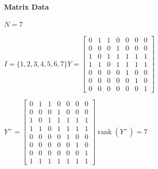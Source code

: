 \documentclass[11pt]{article}
\begin{document}
\noindent\textbf{Matrix Data}
\par $N=7$
\par $I=\{1,2,3,4,5,6,7\}$\quad$Y=\begin{bmatrix}0 & 1 & 1 & 0 & 0 & 0 & 0 \\ 0 & 0 & 0 & 1 & 0 & 0 & 0 \\ 1 & 0 & 1 & 1 & 1 & 1 & 1 \\ 1 & 1 & 0 & 1 & 1 & 1 & 1 \\ 0 & 0 & 0 & 0 & 1 & 0 & 0 \\ 0 & 0 & 0 & 0 & 0 & 1 & 0 \\ 0 & 0 & 0 & 0 & 0 & 0 & 1\end{bmatrix}$
\par $Y^{+}=\begin{bmatrix}0 & 1 & 1 & 0 & 0 & 0 & 0 \\ 0 & 0 & 0 & 1 & 0 & 0 & 0 \\ 1 & 0 & 1 & 1 & 1 & 1 & 1 \\ 1 & 1 & 0 & 1 & 1 & 1 & 1 \\ 0 & 0 & 0 & 0 & 1 & 0 & 0 \\ 0 & 0 & 0 & 0 & 0 & 1 & 0 \\ 0 & 0 & 0 & 0 & 0 & 0 & 1 \\ 1 & 1 & 1 & 1 & 1 & 1 & 1\end{bmatrix}$\quad$\operatorname{rank}(Y^{+})=7$
\end{document}
